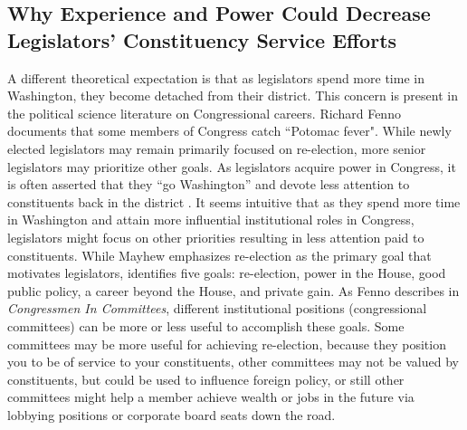 \documentclass{article}
\begin{document}

\subsection{Why Experience and Power Could Decrease Legislators' Constituency Service Efforts}

A different theoretical expectation is that as legislators spend more time in Washington, they become detached from their district.  This concern is present in the political science literature on Congressional careers. Richard Fenno documents that some members of Congress catch ``Potomac fever".  While newly elected legislators may remain primarily focused on re-election, more senior legislators may prioritize other goals. As legislators acquire power in Congress, it is often asserted that they ``go Washington'' and devote less attention to constituents back in the district \citep{Fenno1978}.  It seems intuitive that as they spend more time in Washington and attain more influential institutional roles in Congress, legislators might focus on other priorities resulting in less attention paid to constituents.   While Mayhew emphasizes re-election as the primary goal that motivates legislators, \citet{Fenno1973} identifies five goals: re-election, power in the House, good public policy, a career beyond the House, and private gain.  As Fenno describes in \textit{Congressmen In Committees}, different institutional positions (congressional committees) can be more or less useful to accomplish these goals.  Some committees may be more useful for achieving re-election, because they position you to be of service to your constituents, other committees may not be valued by constituents, but could be used to influence foreign policy, or still other committees might help a member achieve wealth or jobs in the future via lobbying positions or corporate board seats down the road.     
\end{document}
